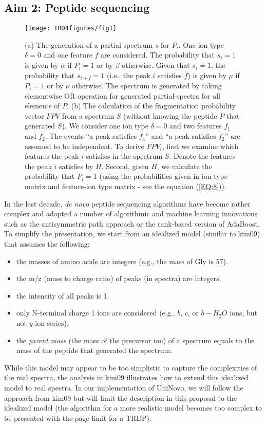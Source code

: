
\subsection{Aim 2: Peptide sequencing} 


\begin{figure*}[!tpb]
\centerline{\texttt{[image: TRD4figures/fig1]}}
\caption{\footnotesize (a) The generation of a partial-spectrum $s$ for $P_i$. One ion type $\delta=0$ and one feature $f$ are considered.  The probability that $s_i=1$ is given by $\alpha$ if $P_i=1$ or by $\beta$ otherwise. Given that $s_i=1$,  the probability that $s_{i+f}=1$ (i.e., the peak $i$ satisfies $f$) is given by  $\mu$ if $P_i=1$ or by $\nu$ otherwise. The spectrum is generated by taking elementwise OR operation for generated partial-spectra for all elements of  $P$. 
(b) The calculation of the fragmentation probability vector $FPV$  from a spectrum $S$ (without knowing the peptide $P$ that generated $S$).  We consider  one ion type $\delta=0$ and two features $f_1$ and $f_2$.  The events ``a peak satisfies $f_1$'' and ``a peak satisfies $f_2$'' are assumed to be independent.   To derive $FPV_i$, first we examine which features the peak $i$ satisfies in the spectrum $S$. Denote the features the peak $i$ satisfies by $H$. Second, given $H$, we calculate the probability that $P_i=1$ (using the probabilities given  in ion type matrix and feature-ion type matrix - see the equation (\ref{EQ:8})).\newline
}\label{FIG:1}
\end{figure*}

In the last decade, {\em de novo} peptide sequencing algorithms have become rather complex and adopted a number of 
algorithmic and machine learning innovations such as the antisymmetric path approach or the rank-based version of AdaBoost. To simplify the presentation, we start from an idealized model (similar to \cite{unv}{kim09}) that  assumes the following:
\begin{itemize}
\item the masses of amino acids are integers (e.g., the mass of Gly is 57).
\item the m/z (mass to charge ratio) of peaks (in spectra) are integers.
\item the intensity of all peaks is 1.
\item only N-terminal charge 1 ions are considered (e.g., $b$, $c$, or $b-H_2O$ ions, but not $y$-ion series).
\item the {\em parent mass} (the mass of the precursor ion) of a spectrum equals to the mass of the peptide that generated the spectrum. 
\end{itemize}
While this model may appear to be too simplistic to capture the complexities of the real spectra, the analysis in \cite{unv}{kim09} illustrates how to extend this idealized model to real spectra. In our implementation of UniNovo, we will follow the approach from  \cite{unv}{kim09} but 
will  limit the description in this proposal to the idealized model (the algorithm for a more realistic model becomes too complex to be presented with the page limit for a TRDP).

